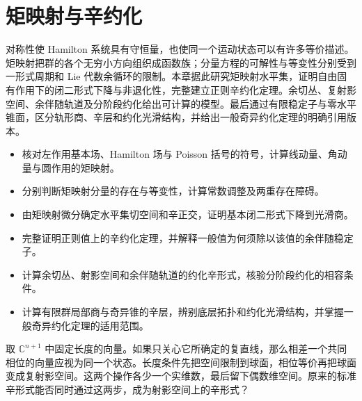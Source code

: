 
% 
% 

\chapter{矩映射与辛约化}
\label{g4:ch:10}

\begin{chapterabstract}
对称性使 Hamilton 系统具有守恒量，也使同一个运动状态可以有许多等价描述。矩映射把群的各个无穷小方向组织成函数族；分量方程的可解性与等变性分别受到一形式周期和 Lie 代数余循环的限制。本章据此研究矩映射水平集，证明自由固有作用下的闭二形式下降与非退化性，完整建立正则辛约化定理。余切丛、复射影空间、余伴随轨道及分阶段约化给出可计算的模型。最后通过有限稳定子与零水平锥面，区分轨形商、辛层和约化光滑结构，并给出一般奇异约化定理的明确引用版本。
\end{chapterabstract}

\begin{learninggoals}
\begin{itemize}
	\item 核对左作用基本场、Hamilton 场与 Poisson 括号的符号，计算线动量、角动量与圆作用的矩映射。
	\item 分别判断矩映射分量的存在与等变性，计算常数调整及两重存在障碍。
	\item 由矩映射微分确定水平集切空间和辛正交，证明基本闭二形式下降到光滑商。
	\item 完整证明正则值上的辛约化定理，并解释一般值为何须除以该值的余伴随稳定子。
	\item 计算余切丛、射影空间和余伴随轨道的约化辛形式，核验分阶段约化的相容条件。
	\item 计算有限群局部商与奇异锥的辛层，辨别底层拓扑和约化光滑结构，并掌握一般奇异约化定理的适用范围。
\end{itemize}
\end{learninggoals}

取 \(\mathbb C^{n+1}\) 中固定长度的向量。如果只关心它所确定的复直线，那么相差一个共同相位的向量应视为同一个状态。长度条件先把空间限制到球面，相位等价再把球面变成复射影空间。这两个操作各少一个实维数，最后留下偶数维空间。原来的标准辛形式能否同时通过这两步，成为射影空间上的辛形式？

